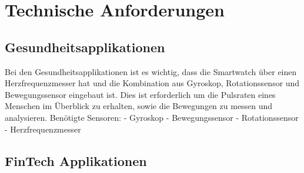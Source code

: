 \chapter{Technische Anforderungen}
\section{Gesundheitsapplikationen}
Bei den Gesundheitsapplikationen ist es wichtig, dass die Smartwatch über einen Herzfrequenzmesser hat und die Kombination aus Gyroskop, Rotationssensor und Bewegungssensor eingebaut ist.
Dies ist erforderlich um die Pulsraten eines Menschen im Überblick zu erhalten, sowie die Bewegungen zu messen und analysieren.
Benötigte Sensoren:
- Gyroskop
- Bewegungssensor
- Rotationssensor
- Herzfrequenzmesser

\section{FinTech Applikationen}
\newpage

